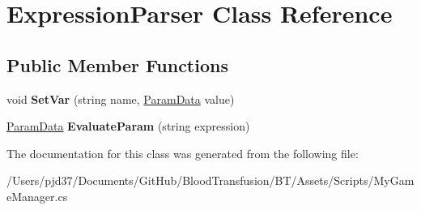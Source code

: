 \hypertarget{class_expression_parser}{}\section{Expression\+Parser Class Reference}
\label{class_expression_parser}
\subsection*{Public Member Functions}
\begin{DoxyCompactItemize}
\item 
void {\bfseries Set\+Var} (string name, \hyperlink{class_param_data}{Param\+Data} value)\hypertarget{class_expression_parser_a5067e1c52821da4c67993e115eb3298e}{}\label{class_expression_parser_a5067e1c52821da4c67993e115eb3298e}

\item 
\hyperlink{class_param_data}{Param\+Data} {\bfseries Evaluate\+Param} (string expression)\hypertarget{class_expression_parser_a3a4c3b2b45de9270e163008462f39136}{}\label{class_expression_parser_a3a4c3b2b45de9270e163008462f39136}

\end{DoxyCompactItemize}


The documentation for this class was generated from the following file\+:\begin{DoxyCompactItemize}
\item 
/\+Users/pjd37/\+Documents/\+Git\+Hub/\+Blood\+Transfusion/\+B\+T/\+Assets/\+Scripts/My\+Game\+Manager.\+cs\end{DoxyCompactItemize}
